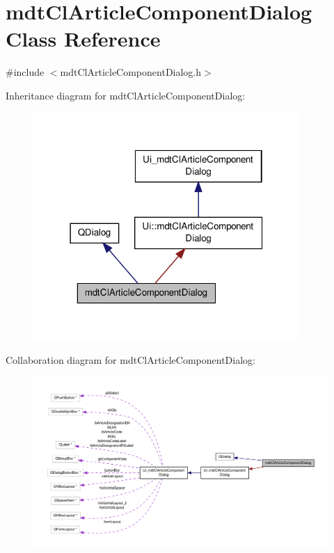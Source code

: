 \hypertarget{classmdt_cl_article_component_dialog}{\section{mdt\-Cl\-Article\-Component\-Dialog Class Reference}
\label{classmdt_cl_article_component_dialog}
}


{\ttfamily \#include $<$mdt\-Cl\-Article\-Component\-Dialog.\-h$>$}



Inheritance diagram for mdt\-Cl\-Article\-Component\-Dialog\-:
\nopagebreak
\begin{figure}[H]
\begin{center}
\leavevmode
\includegraphics[width=286pt]{classmdt_cl_article_component_dialog__inherit__graph}
\end{center}
\end{figure}


Collaboration diagram for mdt\-Cl\-Article\-Component\-Dialog\-:
\nopagebreak
\begin{figure}[H]
\begin{center}
\leavevmode
\includegraphics[width=350pt]{classmdt_cl_article_component_dialog__coll__graph}
\end{center}
\end{figure}

